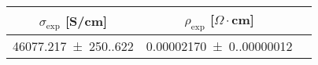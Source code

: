 \begin{tabular}{ccc}
\toprule
$\sigma_{\exp}$ [S/cm] & $\rho_{\exp}$ [$\Omega  \cdot$cm] \\
\midrule
\num{46077.217(250.622)} & \num{0.00002170(0.00000012)} \\
\bottomrule
\end{tabular}
